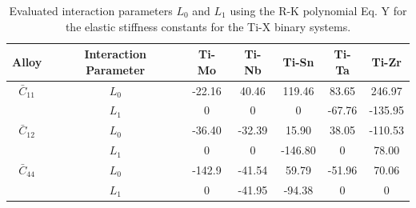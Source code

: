 \newpage
\begin{table}[H]
	\caption{Evaluated interaction parameters $L_0$ and $L_1$ using the R-K polynomial Eq. Y for the elastic stiffness constants for the Ti-X binary systems.}
	\centering
	\begin{tabular}{ c c c c c c c }
		\hline
		Alloy & Interaction Parameter & Ti-Mo & Ti-Nb & Ti-Sn & Ti-Ta & Ti-Zr\\
		\hline
		$\bar{C}_{11}$ & $L_0$ & -22.16 & 40.46 & 119.46 & 83.65 & 246.97\\
		& $L_1$ & 0 & 0 & 0 & -67.76 & -135.95\\
		$\bar{C}_{12}$ & $L_0$ & -36.40 & -32.39 & 15.90 & 38.05 & -110.53\\
		& $L_1$ & 0 & 0 & -146.80 & 0 & 78.00\\
		$\bar{C}_{44}$ & $L_0$ & -142.9 & -41.54 & 59.79 & -51.96 & 70.06\\
		& $L_1$ & 0 & -41.95 & -94.38 & 0 & 0\\	
		\hline
	\end{tabular}
	\label{Ch5-table:tixelasip}
\end{table}
\clearpage

